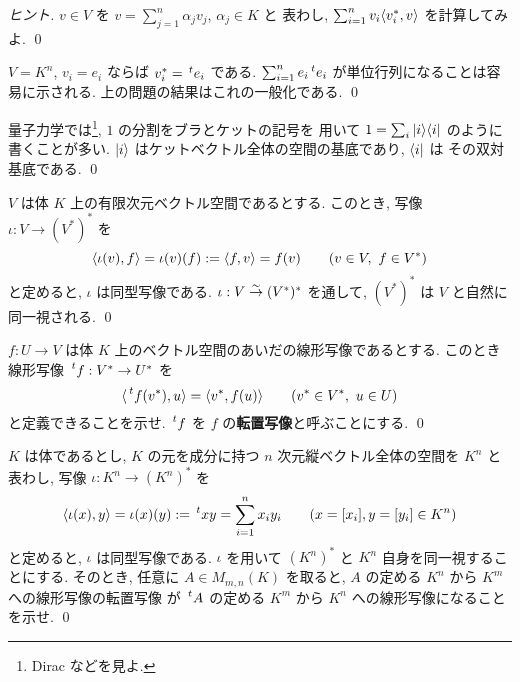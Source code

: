 \documentclass[12pt,twoside]{jarticle}
\begin{document}
\begin{proof}[ヒント]
  $v\in V$ を $v=\sum_{j=1}^n \alpha_j v_j$, $\alpha_j\in K$ と
  表わし, $\sum_{i=1}^n v_i \langle v_i^*, v\rangle$ を計算してみよ.
  \qed
\end{proof}

\begin{rem}
  $V=K^n$, $v_i=e_i$ ならば $v^*_i=\tp{e_i}$ である.
  $\sum_{i=1}^n e_i\tp{e_i}$ が単位行列になることは容易に示される.
  上の問題の結果はこれの一般化である.
  \qed
\end{rem}

\begin{guide}
  量子力学では\footnote{Dirac \cite{Dirac} などを見よ.}, 
  $1$ の分割をブラとケットの記号を
  用いて $1 = \sum_i |i\rangle \langle i|$ のように書くことが多い. 
  $|i\rangle$ はケットベクトル全体の空間の基底であり, $\langle i|$ は
  その双対基底である.
  \qed
\end{guide}


\begin{question}[双対の双対, 10点]
  $V$ は体 $K$ 上の有限次元ベクトル空間であるとする.
  このとき, 写像 $\iota: V\to (V^*)^*$ を
  \begin{equation*}
    \langle \iota(v), f\rangle = \iota(v)(f) := \langle f, v\rangle = f(v)
    \qquad (v\in V,\ f\in V^*)
  \end{equation*}
  と定めると, $\iota$ は同型写像である.
  $\iota:V\overset\sim\rightarrow (V^*)^*$ を通して, $(V^*)^*$ は $V$ と自然に同一視される.
  \qed
\end{question}


\begin{question}[転置写像, 10点]
  $f:U\to V$ は体 $K$ 上のベクトル空間のあいだの線形写像であるとする.
  このとき線形写像 $\tp{f}:V^*\to U^*$ を
  \begin{equation*}
    \bra \tp{f}(v^*), u \ket = \bra v^*, f(u)\ket
    \qquad (v^*\in V^*,\ u\in U)
  \end{equation*}
  と定義できることを示せ.  $\tp{f}$ を $f$ の{\bf 転置写像}と呼ぶことにする.
  \qed
\end{question}


\begin{question}[行列の転置との関係, 10点]
  $K$ は体であるとし, 
  $K$ の元を成分に持つ $n$ 次元縦ベクトル全体の空間を $K^n$ と表わし, 
  写像 $\iota:K^n\to(K^n)^*$ を
  \begin{equation*}
    \bra \iota(x), y\ket = \iota(x)(y) := \tp{x}y = \sum_{i=1}^n x_iy_i
    \qquad (x=[x_i], y=[y_i] \in K^n)
  \end{equation*}
  と定めると, $\iota$ は同型写像である. 
  $\iota$ を用いて $(K^n)^*$ と $K^n$ 自身を同一視することにする.
  そのとき, 任意に $A\in M_{m,n}(K)$ を取ると, 
  $A$ の定める $K^n$ から $K^m$ への線形写像の転置写像
  が $\tp{A}$ の定める $K^m$ から $K^n$ への線形写像になることを示せ.
  \qed
\end{question}
\end{document}
